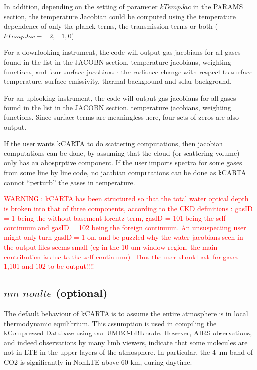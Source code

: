 \documentclass[12pt]{article}
\newcommand{\kc}{\textsf{kCARTA}\xspace}
\begin{document}
{{In addition, depending on the setting
of parameter  $kTempJac$ in the PARAMS section, the temperature Jacobian 
could be computed using the temperature dependence of only the planck terms, 
the transmission terms or both ($kTempJac = -2,-1,0$)

For a downlooking instrument, the code will output gas jacobians for all
gases found in the list in the JACOBN section, temperature jacobians, 
weighting functions, and four surface jacobians : the radiance change with 
respect to surface temperature, surface emissivity, thermal background and 
solar background.

For an uplooking instrument, the code will output gas jacobians for all
gases found in the list in the JACOBN section, temperature jacobians, 
weighting functions. Since surface terms are meaningless here, four sets of 
zeros are also output. 

If the user wants \kc to do scattering computations, then jacobian
computations can be done, by assuming that the cloud (or scattering volume) 
only has an abosprptive component. If the user imports spectra for some
gases from some line by line code, no jacobian computations can be done as
\kc cannot ``perturb'' the gases in temperature.

\textcolor{red}
{WARNING : \kc has been structured so that the total water optical depth is
broken into that of three components, according to the CKD definitions : 
gasID = 1 being the without basement lorentz term, gasID = 101 being the self
continuum and gasID = 102 being the foreign continuum. An unsuspecting user
might only turn gasID = 1 on, and be puzzled why the water jacobians seen
in the output files seems small (eg in the 10 um window region, the main 
contribution is due to the self continuum). Thus the user should ask for gases
1,101 and 102 to be output!!!!}

\subsection{$nm\_nonlte$ (optional)}
The default behaviour of \kc is to assume the entire atmosphere is in local
thermodynamic equilibrium. This assumption is used in compiling the kCompressed
Database using our UMBC-LBL code. However, AIRS observations, and indeed 
observations by many limb viewers, indicate that some molecules are not in LTE
in the upper layers of the atmosphere. In particular, the 4 um band of CO2 is
significantly in NonLTE above 60 km, during daytime. 

}}
\end{document}
